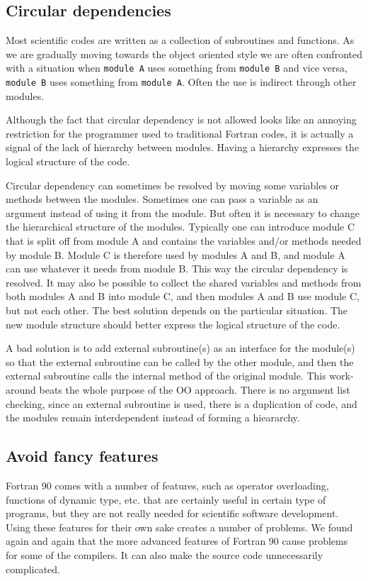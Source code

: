 \documentclass{article}
\begin{document}
\subsection{Circular dependencies}

Most scientific codes are written as a collection of subroutines and 
functions. As we are gradually moving towards the object 
oriented style we are often confronted with a situation when {\tt module A} 
uses something from {\tt module B} and vice versa, {\tt module B} uses
something from {\tt module A}. Often the use is indirect through other modules.

Although the fact that circular dependency is not allowed looks like an 
annoying restriction for the programmer used to traditional Fortran codes,
it is actually a signal of the lack of hierarchy between modules. Having a
hierarchy expresses the logical structure of the code. 

Circular dependency can sometimes be resolved by moving some variables or
methods between the modules. Sometimes one can pass a variable as an argument
instead of using it from the module. But often it is necessary to change the 
hierarchical structure of the modules. Typically one can introduce module C
that is split off from module A and contains the variables and/or methods
needed by module B. Module C is therefore used by modules A and B, 
and module A can use whatever it needs from module B. This way the 
circular dependency is resolved. It may also be possible to collect 
the shared variables and methods from both modules A and B into module C, and
then modules A and B use module C, but not each other. The best solution
depends on the particular situation. The new module structure should better
express the logical structure of the code.

A bad solution is to add external subroutine(s) as an interface 
for the module(s) so that the external subroutine can be called by 
the other module, and then the external subroutine
calls the internal method of the original module. This work-around beats
the whole purpose of the OO approach. There is no argument list checking,
since an external subroutine is used, there is a duplication of code,
and the modules remain interdependent instead of forming a hieararchy.

\subsection{Avoid fancy features}

Fortran 90 comes with a number of features, such as operator overloading,
functions of dynamic type, etc. that are certainly useful in certain
type of programs, but they are not really needed for scientific
software development. 
Using these features for their own sake creates a number of 
problems. We found again and again that the more advanced features of 
Fortran 90 cause problems for some of the compilers. It can also 
make the source code unnecessarily complicated. 
\end{document}
